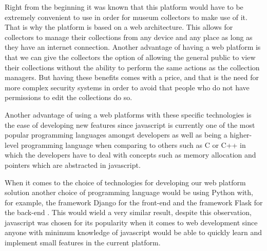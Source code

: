Right from the beginning it was known that this platform would have to be extremely convenient to use in order for museum collectors to make use of it. That is why the platform is based on a web architecture. This allows for collectors to manage their collections from any device and any place as long as they have an internet connection. Another advantage of having a web platform is that we can give the collectors the option of allowing the general public to view their collections without the ability to perform the same actions as the collection managers. But having these benefits comes with a price, and that is the need for more complex security systems in order to avoid that people who do not have permissions to edit the collections do so.


Another advantage of using a web platforms with these specific technologies is the ease of developing new features since javascript is currently one of the most popular programming languages amongst developers as well as being a higher-level programming language when comparing to others such as C or C++ in which the developers have to deal with concepts such as memory allocation and pointers which are abstracted in javascript.


When it comes to the choice of technologies for developing our web platform solution another choice of programming language would be using Python with, for example, the framework Django for the front-end and the framework Flask for the back-end \cite{Langtangen2015UsingApplications}. This would wield a very similar result, despite this observation, javascript was chosen for its popularity when it comes to web development since anyone with minimum knowledge of javascript would be able to quickly learn and implement small features in the current platform.